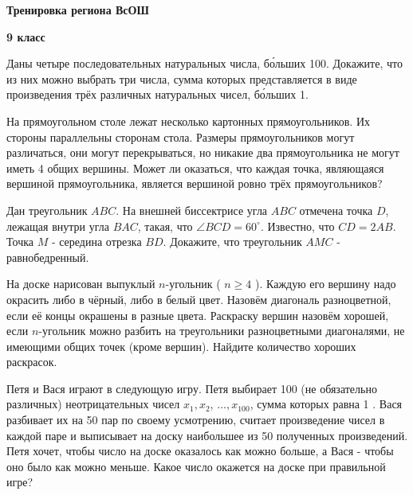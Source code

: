\centerline{\bf \Huge Тренировка региона ВсОШ}
\centerline{\bf \Huge 9 класс}

Даны четыре последовательных натуральных числа, бо́льших 100. Докажите, что из них можно выбрать три числа, сумма которых представляется в виде произведения трёх различных натуральных чисел, бо́льших 1.

На прямоугольном столе лежат несколько картонных прямоугольников. Их стороны параллельны сторонам стола. Размеры прямоугольников могут различаться, они могут перекрываться, но никакие два прямоугольника не могут иметь 4 общих вершины. Может ли оказаться, что каждая точка, являющаяся вершиной прямоугольника, является вершиной ровно трёх прямоугольников?

Дан треугольник $A B C$. На внешней биссектрисе угла $A B C$ отмечена точка $D$, лежащая внутри угла $B A C$, такая, что $\angle B C D=60^{\circ}$. Известно, что $C D=2 A B$. Точка $M$ - середина отрезка $B D$. Докажите, что треугольник $A M C$ - равнобедренный.

На доске нарисован выпуклый $n$-угольник ( $n \geqslant 4$ ). Каждую его вершину надо окрасить либо в чёрный, либо в белый цвет. Назовём диагональ разноцветной, если её концы окрашены в разные цвета. Раскраску вершин назовём хорошей, если $n$-угольник можно разбить на треугольники разноцветными диагоналями, не имеющими общих точек (кроме вершин). Найдите количество хороших раскрасок.

Петя и Вася играют в следующую игру. Петя выбирает 100 (не обязательно различных) неотрицательных чисел $x_1, x_2$, $\ldots, x_{100}$, сумма которых равна 1 . Вася разбивает их на 50 пар по своему усмотрению, считает произведение чисел в каждой паре и выписывает на доску наибольшее из 50 полученных произведений. Петя хочет, чтобы число на доске оказалось как можно больше, а Вася - чтобы оно было как можно меньше. Какое число окажется на доске при правильной игре?